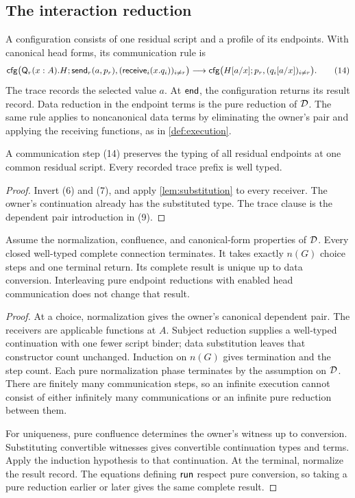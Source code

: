 \subsection{The interaction reduction}

A configuration consists of one residual script and a profile of its
endpoints. With canonical head forms, its communication rule is
\[
 \mathsf{cfg}\bigl(\mathsf Q_r(x:A).H;
       \mathsf{send}_r(a,p_r),(\mathsf{receive}_i(x.q_i))_{i\ne r}\bigr)
 \longrightarrow
 \mathsf{cfg}\bigl(H[a/x];p_r,(q_i[a/x])_{i\ne r}\bigr).
 \tag{14}
\]
The trace records the selected value $a$. At $\mathsf{end}$, the configuration
returns its result record. Data reduction in the endpoint terms is the pure
reduction of $\mathcal D$. The same rule applies to noncanonical data terms by
eliminating the owner's pair and applying the receiving functions, as in
\cref{def:execution}.

\begin{corollary}
\label{cor:preservation}
A communication step (14) preserves the typing of all residual endpoints at
one common residual script. Every recorded trace prefix is well typed.
\end{corollary}
\begin{proof}
Invert (6) and (7), and apply \cref{lem:substitution} to every receiver. The
owner's continuation already has the substituted type. The trace clause is
the dependent pair introduction in (9).
\end{proof}

\begin{theorem}
\label{thm:termination}
Assume the normalization, confluence, and canonical-form properties of $\mathcal D$.
Every closed well-typed complete connection terminates. It takes exactly
$n(G)$ choice steps and one terminal return. Its complete result is unique up
to data conversion. Interleaving pure endpoint reductions with enabled head
communication does not change that result.
\end{theorem}
\begin{proof}
At a choice, normalization gives the owner's canonical dependent pair. The
receivers are applicable functions at $A$. Subject reduction supplies a
well-typed continuation with one fewer script binder; data substitution leaves
that constructor count unchanged. Induction on $n(G)$ gives termination and
the step count. Each pure normalization phase terminates by the assumption on
$\mathcal D$. There are finitely many communication steps, so an infinite execution
cannot consist of either infinitely many communications or an infinite pure
reduction between them.

For uniqueness, pure confluence determines the owner's witness up to
conversion. Substituting convertible witnesses gives convertible continuation
types and terms. Apply the induction hypothesis to that continuation. At the
terminal, normalize the result record. The equations defining $\mathsf{run}$ respect
pure conversion, so taking a pure reduction earlier or later gives the same
complete result.
\end{proof}


